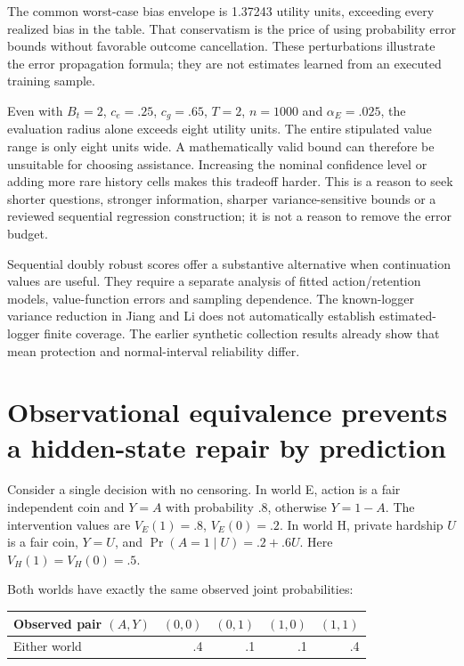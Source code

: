 The common worst-case bias envelope is 1.37243 utility units, exceeding
every realized bias in the table. That conservatism is the price of
using probability error bounds without favorable outcome cancellation.
These perturbations illustrate the error propagation formula; they are
not estimates learned from an executed training sample.

Even with \(B_t=2\), \(c_e=.25\), \(c_g=.65\), \(T=2\), \(n=1000\) and
\(\alpha_E=.025\), the evaluation radius alone exceeds eight utility
units. The entire stipulated value range is only eight units wide. A
mathematically valid bound can therefore be unsuitable for choosing
assistance. Increasing the nominal confidence level or adding more rare
history cells makes this tradeoff harder. This is a reason to seek
shorter questions, stronger information, sharper variance-sensitive
bounds or a reviewed sequential regression construction; it is not a
reason to remove the error budget.

Sequential doubly robust scores offer a substantive alternative when
continuation values are useful. They require a separate analysis of
fitted action/retention models, value-function errors and sampling
dependence. The known-logger variance reduction in Jiang and Li does not
automatically establish estimated-logger finite coverage. The earlier
synthetic collection results already show that mean protection and
normal-interval reliability differ. \citep{jiang2016}

\hypertarget{observational-equivalence-prevents-a-hidden-state-repair-by-prediction}{%
\section{Observational equivalence prevents a hidden-state repair by
prediction}\label{observational-equivalence-prevents-a-hidden-state-repair-by-prediction}}

Consider a single decision with no censoring. In world E, action is a
fair independent coin and \(Y=A\) with probability \(.8\), otherwise
\(Y=1-A\). The intervention values are \(V_E(1)=.8\), \(V_E(0)=.2\). In
world H, private hardship \(U\) is a fair coin, \(Y=U\), and
\(\Pr(A=1\mid U)=.2+.6U\). Here \(V_H(1)=V_H(0)=.5\).

Both worlds have exactly the same observed joint probabilities:

\begin{longtable}[]{@{}lrrrr@{}}
\toprule
Observed pair \((A,Y)\) & \((0,0)\) & \((0,1)\) & \((1,0)\) &
\((1,1)\)\tabularnewline
\midrule
\endhead
Either world & .4 & .1 & .1 & .4\tabularnewline
\bottomrule
\end{longtable}

